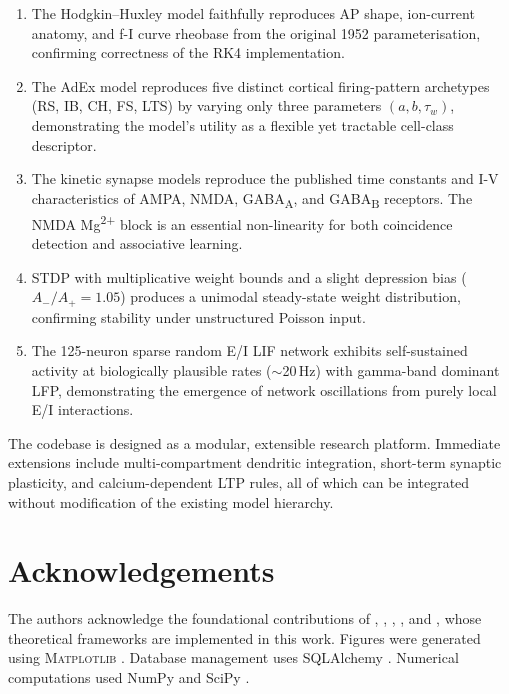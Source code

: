 \documentclass[11pt, a4paper, twocolumn]{article}
\newcommand{\tauw}{\ensuremath{\tau_{w}}}
\newcommand{\Hz}{\ensuremath{\,\mathrm{Hz}}}
\begin{document}
\begin{enumerate}[leftmargin=1.4em, itemsep=3pt]
  \item The Hodgkin--Huxley model faithfully reproduces AP shape,
    ion-current anatomy, and f-I curve rheobase from the original
    1952 parameterisation, confirming correctness of the RK4
    implementation.

  \item The AdEx model reproduces five distinct cortical firing-pattern
    archetypes (RS, IB, CH, FS, LTS) by varying only three parameters
    $(a, b, \tauw)$, demonstrating the model's utility as a flexible
    yet tractable cell-class descriptor.

  \item The kinetic synapse models reproduce the published time constants
    and I-V characteristics of AMPA, NMDA, GABA\textsubscript{A}, and
    GABA\textsubscript{B} receptors. The NMDA Mg\textsuperscript{2+}
    block is an essential non-linearity for both coincidence detection
    and associative learning.

  \item STDP with multiplicative weight bounds and a slight depression
    bias ($A_-/A_+ = 1.05$) produces a unimodal steady-state weight
    distribution, confirming stability under unstructured Poisson input.

  \item The 125-neuron sparse random E/I LIF network exhibits
    self-sustained activity at biologically plausible rates ($\sim$20\Hz)
    with gamma-band dominant LFP, demonstrating the emergence of network
    oscillations from purely local E/I interactions.
\end{enumerate}

The codebase is designed as a modular, extensible research platform.
Immediate extensions include multi-compartment dendritic integration,
short-term synaptic plasticity, and calcium-dependent LTP rules,
all of which can be integrated without modification of the existing
model hierarchy.

\section*{Acknowledgements}

The authors acknowledge the foundational contributions of
\citeauthor{HodgkinHuxley1952}, \citeauthor{Brette2005},
\citeauthor{Destexhe1994}, \citeauthor{Bi1998}, and \citeauthor{Brunel2000},
whose theoretical frameworks are implemented in this work.
Figures were generated using \textsc{Matplotlib} \citep{Hunter2007}.
Database management uses SQLAlchemy \citep{Bayer2012}.
Numerical computations used NumPy \citep{Harris2020} and SciPy \citep{Virtanen2020}.


\end{document}
